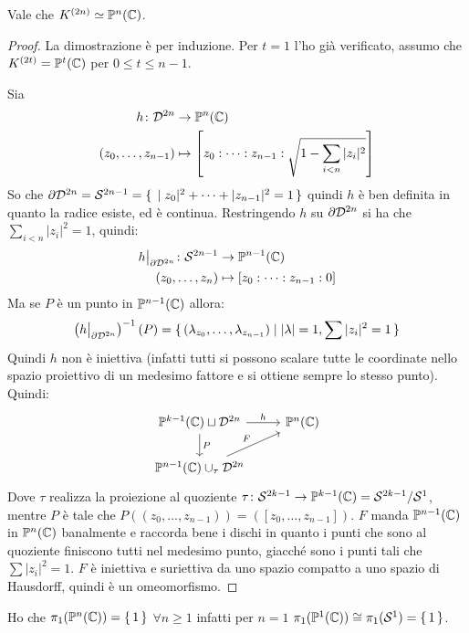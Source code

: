 \begin{proposition}
  Vale che $ K^{(2n)} \simeq \Pjc{n} $.
\end{proposition}
\begin{proof}
  La dimostrazione è per induzione. Per $ t = 1 $ l'ho già verificato, assumo
  che $ K^{(2t)} = \Pjc{t} $ per $ 0 \leq t \leq n-1 $.

  Sia
  \begin{align*}
    h \colon \Disk{2n} & \to \Pjc{n} \\
    (z_0, \dots, z_{n-1}) & \mapsto \left[z_0:\dots: z_{n-1}:\sqrt{1 - \sum_{i < n}|z_i|^2} \right]
  \end{align*}
  So che $ \partial \Disk{2n} = \Sph{2n-1} = \set{|z_0|^2 + \dots + |z_{n-1}|^2 = 1} $
  quindi $ h $ è ben definita in quanto la radice esiste, ed è continua.
  Restringendo $ h $ su $ \partial \Disk{2n} $ si ha che $ \sum_{i < n}|z_i|^2 = 1 $,
  quindi:
  \begin{align*}
    h \big \lvert_{\partial \Disk{2n}} \colon \Sph{2n-1} & \to \Pjc{n-1} \\
    (z_0, \dots, z_{n}) & \mapsto [z_0: \dots: z_{n-1}: 0]
  \end{align*}
  Ma se $ P $ è un punto in $ \Pjc{n-1} $ allora:
  \[
    \left( h \big \lvert_{\partial \Disk{2n}}\right)^{-1}(P) = \set{ (\lambda_{z_0}, \dots, \lambda_{z_{n-1}}) | |\lambda| = 1, \sum|z_i|^2 = 1} %
  \]
  Quindi $ h $ non è iniettiva (infatti tutti si possono scalare tutte le
  coordinate nello spazio proiettivo di un medesimo fattore e si ottiene sempre
  lo stesso punto). Quindi:
  \[
    \begin{tikzcd}
      \Pjc{k-1} \sqcup \Disk{2n} \rar{h} \dar{P} & \Pjc{n} \\
      \Pjc{n-1} \cup_\tau \Disk{2n} \arrow{ur}{F} & {}
    \end{tikzcd}
  \]
  Dove $ \tau $ realizza la proiezione al quoziente
  $ \tau \colon \Sph{2k-1} \to \Pjc{k-1} = \Sph{2k-1} \slash \Sph{1} $, mentre
  $ P $ è tale che $ P((z_0, \dots, z_{n-1})) = ([z_0, \dots, z_{n-1}]) $. $ F $ manda
  $ \Pjc{n-1} $ in $ \Pjc{n} $ banalmente e raccorda bene i dischi in quanto i
  punti che sono al quoziente finiscono tutti nel medesimo punto, giacché sono i
  punti tali che $ \sum | z_i |^2 = 1 $. $ F $ è iniettiva e suriettiva da uno
  spazio compatto a uno spazio di Hausdorff, quindi è un omeomorfismo.
\end{proof}
\eproof
Ho che $ \pi_1(\Pjc{n}) = \set{1} $ $ \forall n \geq 1 $
infatti per $ n = 1 $ $ \pi_1(\Pjc{1}) \cong \pi_1(\Sph[1]) = \set{1} $.
